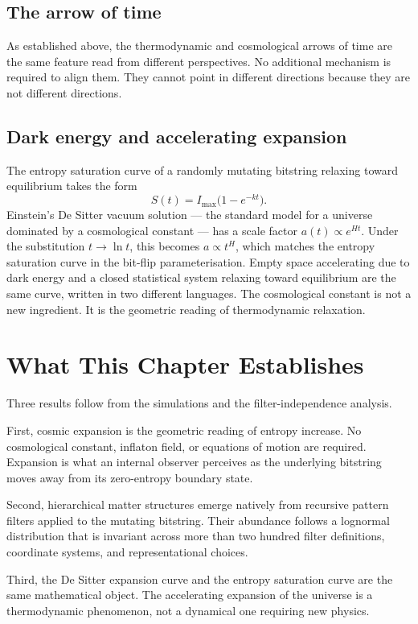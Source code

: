 \subsection*{The arrow of time}

As established above, the thermodynamic and cosmological arrows of time
are the same feature read from different perspectives. No additional
mechanism is required to align them. They cannot point in different
directions because they are not different directions.

\subsection*{Dark energy and accelerating expansion}

The entropy saturation curve of a randomly mutating bitstring relaxing
toward equilibrium takes the form
\[
S(t) = I_{\max}\bigl(1 - e^{-kt}\bigr).
\]
Einstein's De Sitter vacuum solution --- the standard model for a
universe dominated by a cosmological constant --- has a scale factor
$a(t) \propto e^{Ht}$. Under the substitution $t \to \ln t$, this
becomes $a \propto t^H$, which matches the entropy saturation curve in
the bit-flip parameterisation. Empty space accelerating due to dark
energy and a closed statistical system relaxing toward equilibrium are
the same curve, written in two different languages. The cosmological
constant is not a new ingredient. It is the geometric reading of
thermodynamic relaxation.

\section{What This Chapter Establishes}

Three results follow from the simulations and the filter-independence
analysis.

First, cosmic expansion is the geometric reading of entropy increase.
No cosmological constant, inflaton field, or equations of motion are
required. Expansion is what an internal observer perceives as the
underlying bitstring moves away from its zero-entropy boundary state.

Second, hierarchical matter structures emerge natively from recursive
pattern filters applied to the mutating bitstring. Their abundance
follows a lognormal distribution that is invariant across more than two
hundred filter definitions, coordinate systems, and representational
choices.

Third, the De Sitter expansion curve and the entropy saturation curve
are the same mathematical object. The accelerating expansion of the
universe is a thermodynamic phenomenon, not a dynamical one requiring
new physics.

